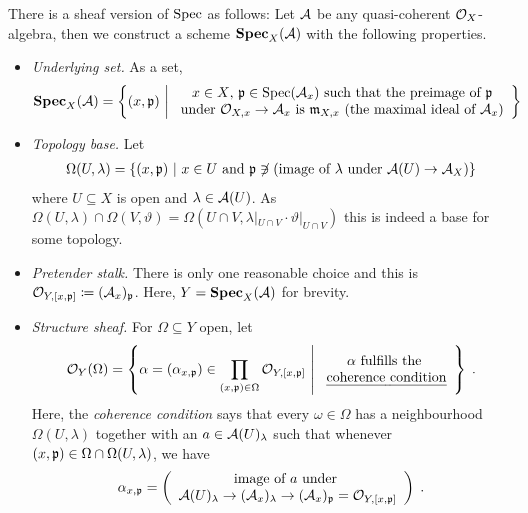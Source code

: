 \documentclass[a4paper,parskip=half,numbers=enddot, DIV=12]{scrreprt}
\begin{document}
There is a sheaf version of $\operatorname{Spec}$ as follows:
Let $\mathcal{A}$ be any quasi-coherent $\mathcal{O}_X$-algebra, then we construct a scheme $\operatorname{\mathbf{Spec}}_X(\mathcal{A})$ with the following properties.
\begin{itemize}
	\item \emph{Underlying set.} As a set,
	\begin{align*}
		\SPEC_X(\Aa) = \left\{(x,\pp) \st 
		\begin{array}{c}
			x\in X\text{, }\pp \in \Spec(\Aa_x) \text{ such that the preimage of }\pp\\
			\text{under } \Oo_{X,x}\morphism \Aa_x \text{ is } \mm_{X,x}\text{ (the maximal ideal of }\Aa_x)
		\end{array}
		\right\}
	\end{align*}
	\item \emph{Topology base.} Let
	\begin{align*}
		\Omega(U,\lambda) = \left\{ (x,\mathfrak{p}) \ \middle|\  x\in U\text{ and }\mathfrak{p}\not\ni (\text{image of } \lambda \text{ under } \mathcal{A}(U)\to \mathcal{A}_X)\right\}
	\end{align*}
	where $U\subseteq X$ is open and $\lambda \in \mathcal{A}(U)$. As $\Omega(U,\lambda) \cap \Omega(V,\vartheta) = \Omega(U\cap V, \lambda|_{U\cap V} \cdot \vartheta|_{U\cap V})$ this is indeed a base for some topology.
	\item \emph{Pretender stalk.} There is only one reasonable choice and this is $\mathcal{O}_{Y,[x,\mathfrak{p}]} \coloneqq (\mathcal{A}_x)_{\mathfrak{p}}$. Here, $Y=\operatorname{\mathbf{Spec}}_X(\mathcal{A})$ for brevity.
	\item \emph{Structure sheaf.} For $\Omega\subseteq Y$ open, let
	\begin{align*}
	\mathcal{O}_Y(\Omega) = \left\{\alpha=(\alpha_{x,\mathfrak{p}})\in \prod_{(x,\mathfrak{p})\in \Omega} \mathcal{O}_{Y,[x,\mathfrak{p}]}\ \middle|\  
	\begin{array}{c}
		\alpha\text{ fulfills the }\\
		\text{\emph{coherence condition}}
	\end{array}
	\right\}\;.
	\end{align*}
	Here, the \emph{coherence condition} says that every $\omega\in \Omega$ has a neighbourhood $\Omega(U,\lambda)$ together with an $a\in \mathcal{A}(U)_\lambda$ such that whenever $(x,\mathfrak{p})\in \Omega\cap \Omega(U,\lambda)$, we have
	\begin{align*}
		\alpha_{x,\pp}=\left(
		\begin{array}{c}
			\text{image of }a\text{ under }\\
			\Aa(U)_\lambda \morphism (\Aa_x)_\lambda \morphism (\Aa_x)_\pp = \Oo_{Y,[x,\pp]}
		\end{array}\right)\;.
	\end{align*}
\end{itemize}
\end{document}
